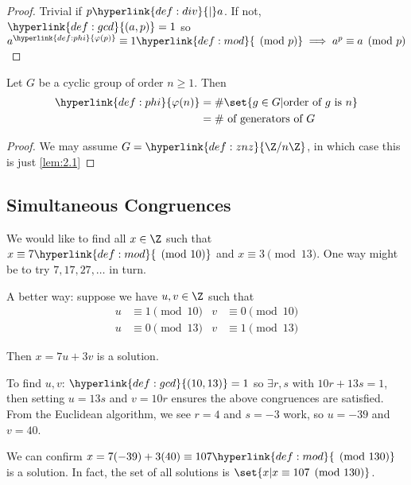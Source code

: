\documentclass{article}
\begin{document}
\begin{proof}
    Trivial if $p \hyperlink{def:div}{\mid} a$.  If not, $\hyperlink{def:gcd}{(a, p)} = 1$ so $a^{\hyperlink{def:phi}{\varphi(p)}} \equiv 1 \hyperlink{def:mod}{\pmod{p}} \implies a^p \equiv a \pmod{p}$
\end{proof}


\begin{nlemma}\label{lem:2.2}
    Let $G$ be a cyclic group of order $n \geq 1$. Then
    \begin{align*}
        \hyperlink{def:phi}{\varphi (n)} &=  \# \set{g \in G | \text{order of } g \text{ is } n} \\
                    &=  \# \text{ of generators of } G
    \end{align*}
\end{nlemma}

\begin{proof}
    We may assume $G = \hyperlink{def:znz}{\Z/ n \Z}$, in which case this is just \cref{lem:2.1}
\end{proof}

\subsection{Simultaneous Congruences}

\begin{eg}
    We would like to find all $x \in \Z$ such that $x \equiv 7 \hyperlink{def:mod}{\pmod{10}}$ and $x \equiv 3 \pmod{13}$.
    One way might be to try $7, 17, 27, \dotsc$ in turn.

    A better way: suppose we have $u, v \in \Z$ such that
    \begin{align*}
        u &\equiv 1 \pmod{10} & v &\equiv 0 \pmod{10} \\
        u &\equiv 0 \pmod{13} & v &\equiv 1 \pmod{13}
    \end{align*}

    Then $x = 7u + 3v$ is a solution.

    To find $u, v$: $\hyperlink{def:gcd}{(10, 13)} = 1$ so $\exists r, s$ with $10r + 13s = 1$, then setting $u=13s$ and $v=10r$ ensures the above congruences are satisfied.
    From the Euclidean algorithm, we see $r=4$ and $s=-3$ work, so $u=-39$ and $v=40$.

    We can confirm $x = 7(-39) + 3(40) \equiv 107 \hyperlink{def:mod}{\pmod{130}}$ is a solution.
    In fact, the set of all solutions is $ \set{ x | x \equiv 107 \pmod {130}} $.
\end{eg}
\end{document}
